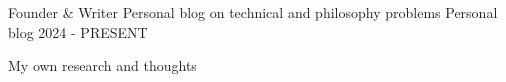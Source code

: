 


\begin{cventries}


\cventry
{Founder \& Writer} %
{Personal blog on technical and philosophy problems} %
{Personal blog} %
{2024 - PRESENT} %
{ %
\begin{cvitems}
\item {My own research and thoughts}
\end{cvitems}
}



\end{cventries}